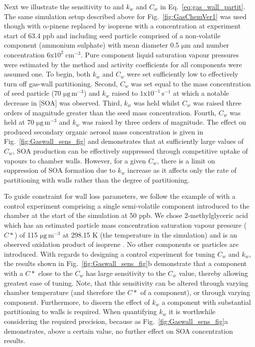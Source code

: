 \documentclass[gmd, manuscript]{copernicus}
\begin{document}
Next we illustrate the sensitivity to and $k_{w}$ and $C_{w}$ in Eq.~\ref{eq:gas_wall_partit}.  The same simulation setup described above for Fig.~\ref{fig:GasChemVer1} was used though with $\mathrm{\alpha}$-pinene replaced by isoprene with a concentration at experiment start of 63.4 ppb and including seed particle comprised of a non-volatile component (ammonium sulphate) with mean diameter 0.5 $\mathrm{\mu m}$ and number concentration $\mathrm{6x10^{2}\; cm^{-3}}$.  Pure component liquid saturation vapour pressures were estimated by the \citet{Nannoolal2008} method and activity coefficients for all components were assumed one.  To begin, both $k_{w}$ and $C_{w}$ were set sufficiently low to effectively turn off gas-wall partitioning.  Second, $C_{w}$ was set equal to the mass concentration of seed particle (70 $\mathrm{\mu g\,m^{-3}}$) and $k_{w}$ raised to $\mathrm{1x10^{-1}\, s^{-1}}$ at which a notable decrease in [SOA] was observed.  Third, $k_{w}$ was held whilst $C_{w}$ was raised three orders of magnitude greater than the seed mass concentration.  Fourth, $C_{w}$ was held at 70 $\mathrm{\mu g\,m^{-3}}$ and $k_{w}$ was raised by three orders of magnitude.  The effect on produced secondary organic aerosol mass concentration is given in Fig.~\ref{fig:Gaswall_sens_fig} and demonstrates that at sufficiently large values of $C_{w}$, SOA production can be effectively suppressed through competitive uptake of vapours to chamber walls.  However, for a given $C_{w}$, there is a limit on suppression of SOA formation due to $k_{w}$ increase as it affects only the rate of partitioning with walls rather than the degree of partitioning.

To guide constraint for wall loss parameters, we follow the example of \citet{Matsunaga2010} with a control experiment comprising a single semi-volatile component introduced to the chamber at the start of the simulation at 50 ppb.  We chose 2-methylglyceric acid which has an estimated particle mass concentration saturation vapour pressure ($C*$) of 115 $\mathrm{\mu g\,m^{-3}}$ at 298.15 K (the temperature in the simulation) and is an observed oxidation product of isoprene \citep{Surratt2006}.  No other components or particles are introduced.  With regards to designing a control experiment for tuning $C_{w}$ and $k_{w}$, the results shown in Fig.~\ref{fig:Gaswall_sens_fig}b demonstrate that a component with a $C*$ close to the $C_{w}$ has large sensitivity to the $C_{w}$ value, thereby allowing greatest ease of tuning.  Note, that this sensitivity can be altered through varying chamber temperature (and therefore the $C*$ of a component), or through varying component.  Furthermore, to discern the effect of $k_{w}$ a component with substantial partitioning to walls is required.  When quantifying $k_{w}$ it is worthwhile considering the required precision, because as Fig.~\ref{fig:Gaswall_sens_fig}a demonstrates, above a certain value, no further effect on SOA concentration results.
\end{document}
